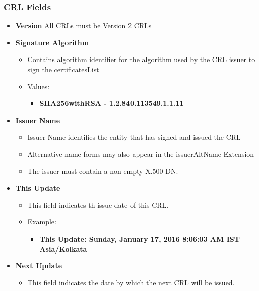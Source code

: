 \documentclass[a4paper]{article}
\begin{document}
    \subsubsection{CRL Fields}
    \begin{itemize}
        \item \textbf{Version} All CRLs must be Version 2 CRLs
        \item \textbf{Signature Algorithm}
            \begin{itemize}
                \item Contains algorithm identifier for the algorithm used by the CRL issuer to sign the certificatesList
                \item Values:
                    \begin{itemize}
                        \item \textbf{SHA256withRSA - 1.2.840.113549.1.1.11}
                    \end{itemize}
            \end{itemize}
        \item \textbf{Issuer Name}
            \begin{itemize}
                \item Issuer Name identifies the entity that has signed and issued the CRL
                \item Alternative name forms may also appear in the issuerAltName Extension
                \item The issuer must contain a non-empty X.500 DN.
            \end{itemize}
        \item \textbf{This Update}
            \begin{itemize}
                \item This field indicates th issue date of this CRL. 
                \item Example:
                    \begin{itemize}
                        \item \textbf{This Update: Sunday, January 17, 2016 8:06:03 AM IST Asia/Kolkata}
                    \end{itemize}
            \end{itemize}
        \item \textbf{Next Update}
            \begin{itemize}
                \item This field indicates the date by which the next CRL will be issued. 

\end{itemize}
\end{itemize}
\end{document}
